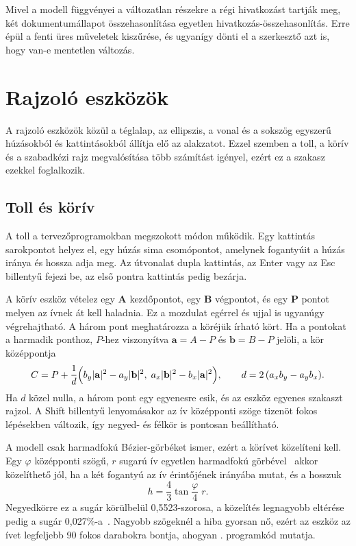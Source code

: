Mivel a modell függvényei a változatlan részekre a régi hivatkozást tartják meg, két dokumentumállapot összehasonlítása egyetlen hivatkozás-összehasonlítás. Erre épül a fenti üres műveletek kiszűrése, és ugyanígy dönti el a szerkesztő azt is, hogy van-e mentetlen változás.

\section{Rajzoló eszközök}
\label{sec:drawing_tools}

A rajzoló eszközök közül a téglalap, az ellipszis, a vonal és a sokszög egyszerű húzásokból és kattintásokból állítja elő az alakzatot. Ezzel szemben a toll, a körív és a szabadkézi rajz megvalósítása több számítást igényel, ezért ez a szakasz ezekkel foglalkozik.

\subsection{Toll és körív}

A toll a tervezőprogramokban megszokott módon működik. Egy kattintás sarokpontot helyez el, egy húzás sima csomópontot, amelynek fogantyúit a húzás iránya és hossza adja meg. Az útvonalat dupla kattintás, az Enter vagy az Esc billentyű fejezi be, az első pontra kattintás pedig bezárja.

A körív eszköz vételez egy $\mathbf{A}$ kezdőpontot, egy $\mathbf{B}$ végpontot, és egy $\mathbf{P}$ pontot melyen az ívnek át kell haladnia. Ez a mozdulat egérrel és ujjal is ugyanúgy végrehajtható. A három pont meghatározza a köréjük írható kört. Ha a pontokat a harmadik ponthoz, $P$-hez viszonyítva $\mathbf{a} = A - P$ és $\mathbf{b} = B - P$ jelöli, a kör középpontja
\[
C = P + \frac{1}{d}\Bigl(b_y |\mathbf{a}|^2 - a_y |\mathbf{b}|^2,\; a_x |\mathbf{b}|^2 - b_x |\mathbf{a}|^2\Bigr),
\qquad d = 2\,(a_x b_y - a_y b_x).
\]
Ha $d$ közel nulla, a három pont egy egyenesre esik, és az eszköz egyenes szakaszt rajzol. A Shift billentyű lenyomásakor az ív középponti szöge tizenöt fokos lépésekben változik, így negyed- és félkör is pontosan beállítható.

A modell csak harmadfokú Bézier-görbéket ismer, ezért a körívet közelíteni kell. Egy $\varphi$ középponti szögű, $r$ sugarú ív egyetlen harmadfokú görbével~\cite{goldapp1991} akkor közelíthető jól, ha a két fogantyú az ív érintőjének irányába mutat, és a hosszuk
\[
h = \frac{4}{3}\tan\frac{\varphi}{4}\; r .
\]
Negyedkörre ez a sugár körülbelül 0{,}5523-szorosa, a közelítés legnagyobb eltérése pedig a sugár 0{,}027\%-a~\cite{bezier-primer}. Nagyobb szögeknél a hiba gyorsan nő, ezért az eszköz az ívet legfeljebb 90 fokos darabokra bontja, ahogyan . programkód mutatja.

